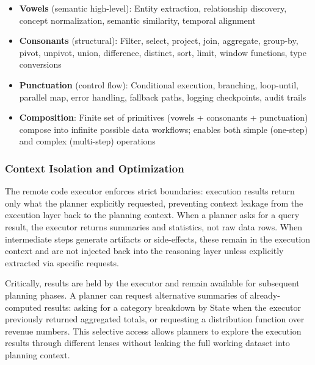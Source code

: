 \documentclass[sigconf]{acmart}
\newcommand{\reviewnote}[1]{}
\newcommand{\reviewnote}[1]{\marginnote{\raggedright\footnotesize\textit{#1}}}
\begin{document}
\begin{itemize}
  \item \textbf{Vowels} (semantic high-level): Entity extraction, relationship discovery, concept normalization, semantic similarity, temporal alignment
  \item \textbf{Consonants} (structural): Filter, select, project, join, aggregate, group-by, pivot, unpivot, union, difference, distinct, sort, limit, window functions, type conversions
  \item \textbf{Punctuation} (control flow): Conditional execution, branching, loop-until, parallel map, error handling, fallback paths, logging checkpoints, audit trails
  \item \textbf{Composition}: Finite set of primitives (vowels + consonants + punctuation) compose into infinite possible data workflows; enables both simple (one-step) and complex (multi-step) operations
\end{itemize}

\subsubsection{Context Isolation and Optimization}

The remote code executor enforces strict boundaries: execution results return only what the planner explicitly requested, preventing context leakage from the execution layer back to the planning context. When a planner asks for a query result, the executor returns summaries and statistics, not raw data rows. When intermediate steps generate artifacts or side-effects, these remain in the execution context and are not injected back into the reasoning layer unless explicitly extracted via specific requests.

Critically, results are held by the executor and remain available for subsequent planning phases. A planner can request alternative summaries of already-computed results: asking for a category breakdown by State when the executor previously returned aggregated totals, or requesting a distribution function over revenue numbers. This selective access allows planners to explore the execution results through different lenses without leaking the full working dataset into planning context.\reviewnote{Security question: Who has access to data in the remote execution layer? Are there data governance policies? Can one user's executor access another user's data? Needs discussion of multi-tenancy + data isolation beyond what's mentioned.}
\end{document}
